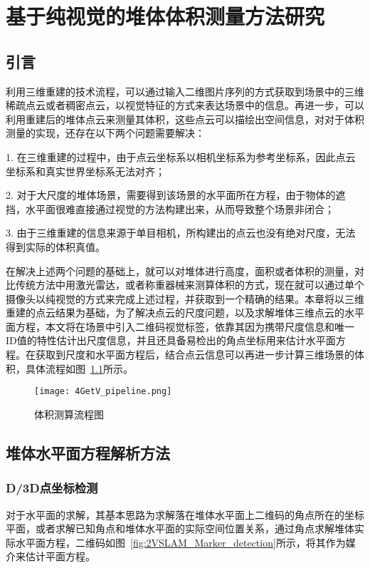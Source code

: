 \chapter{基于纯视觉的堆体体积测量方法研究}
\label{cha:chap4}
\section{引言}
\label{sec:4.1}
利用三维重建的技术流程，可以通过输入二维图片序列的方式获取到场景中的三维稀疏点云或者稠密点云，以视觉特征的方式来表达场景中的信息。再进一步，可以利用重建后的堆体点云来测量其体积，这些点云可以描绘出空间信息，对对于体积测量的实现，还存在以下两个问题需要解决：

1.	在三维重建的过程中，由于点云坐标系以相机坐标系为参考坐标系，因此点云坐标系和真实世界坐标系无法对齐；

2.	对于大尺度的堆体场景，需要得到该场景的水平面所在方程，由于物体的遮挡，水平面很难直接通过视觉的方法构建出来，从而导致整个场景非闭合；

3. 由于三维重建的信息来源于单目相机，所构建出的点云也没有绝对尺度，无法得到实际的体积真值。

在解决上述两个问题的基础上，就可以对堆体进行高度，面积或者体积的测量，对比传统方法中用激光雷达，或者称重器械来测算体积的方式，现在就可以通过单个摄像头以纯视觉的方式来完成上述过程，并获取到一个精确的结果。本章将以三维重建的点云结果为基础，为了解决点云的尺度问题，以及求解堆体三维点云的水平面方程，本文将在场景中引入二维码视觉标签，依靠其因为携带尺度信息和唯一ID值的特性估计出尺度信息，并且还具备易检出的角点坐标用来估计水平面方程。在获取到尺度和水平面方程后，结合点云信息可以再进一步计算三维场景的体积，具体流程如图~\ref{fig:4GetV_pipeline}所示。
\begin{figure}[H] %
    \centering
    \texttt{[image: 4GetV\_pipeline.png]}
    \caption{体积测算流程图}
    \label{fig:4GetV_pipeline}
  \end{figure}
\section{堆体水平面方程解析方法}
\label{sec:4.2}
\subsection{D/3D点坐标检测}
\label{sec:4.2.1}
对于水平面的求解，其基本思路为求解落在堆体水平面上二维码的角点所在的坐标平面，或者求解已知角点和堆体水平面的实际空间位置关系，通过角点求解堆体实际水平面方程，二维码如图~\ref{fig:2VSLAM_Marker_detection}所示，将其作为媒介来估计平面方程。

